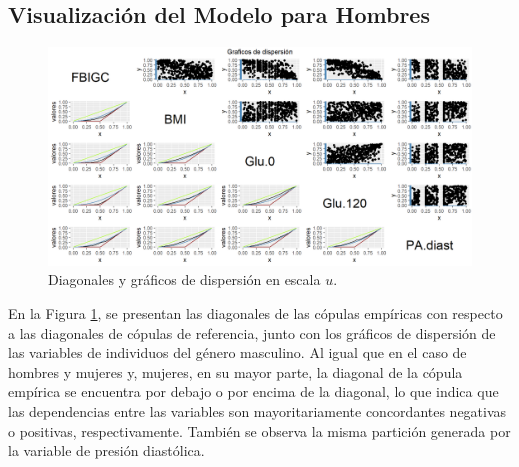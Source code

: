 \begin{landscape}
\subsection{Visualización del Modelo para Hombres}

\begin{figure}[H]
    \centering
    \includegraphics[height = 13.5 cm, width = 1.4 \textwidth]{4img/UdiagH.png}
    \caption{Diagonales y gráficos de dispersión en escala $u$.}
    \label{fig:diagHo}
\end{figure}
\end{landscape}

En la Figura \ref{fig:diagHo}, se presentan las diagonales de las cópulas empíricas con respecto a las diagonales de cópulas de referencia, junto con los gráficos de dispersión de las variables de individuos del género masculino. Al igual que en el caso de hombres y mujeres y, mujeres, en su mayor parte, la diagonal de la cópula empírica se encuentra por debajo o por encima de la diagonal, lo que indica que las dependencias entre las variables son mayoritariamente concordantes negativas o positivas, respectivamente. También se observa la misma partición generada por la variable de presión diastólica.

